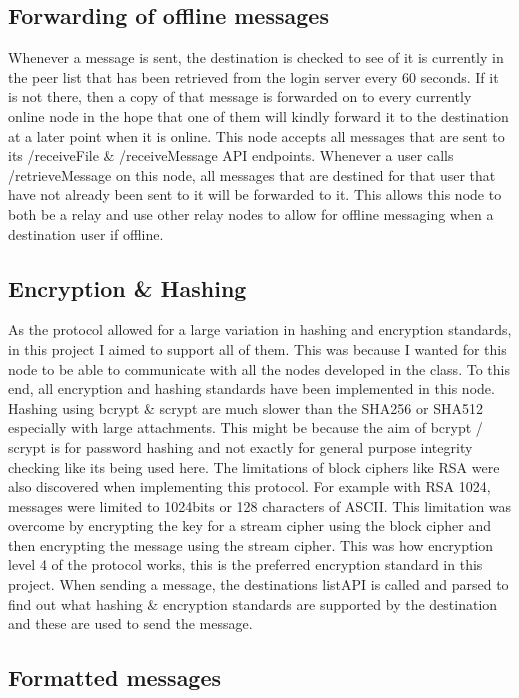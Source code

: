 \documentclass[a4paper,10pt,twoside]{article}
\begin{document}
\subsection{Forwarding of offline messages}

Whenever a message is sent, the destination is checked to see of it is currently in the peer list that has been retrieved from the login server every 60 seconds. If it is not there, then a copy of that message is forwarded on to every currently online node in the hope that one of them will kindly forward it to the destination at a later point when it is online. This node accepts all messages that are sent to its /receiveFile \& /receiveMessage API endpoints. Whenever a user calls /retrieveMessage on this node, all messages that are destined for that user that have not already been sent to it will be forwarded to it. This allows this node to both be a relay and use other relay nodes to allow for offline messaging when a destination user if offline.

\subsection{Encryption \& Hashing}

As the protocol allowed for a large variation in hashing and encryption standards, in this project I aimed to support all of them. This was because I wanted for this node to be able to communicate with all the nodes developed in the class. To this end, all encryption and hashing standards have been implemented in this node. Hashing using bcrypt \& scrypt are much slower than the SHA256 or SHA512 especially with large attachments. This might be because the aim of bcrypt / scrypt is for password hashing and not exactly for general purpose integrity checking like its being used here. The limitations of block ciphers like RSA were also discovered when implementing this protocol. For example with RSA 1024, messages were limited to 1024bits or 128 characters of ASCII. This limitation was overcome by encrypting the key for a stream cipher using the block cipher and then encrypting the message using the stream cipher. This was how encryption level 4 of the protocol works, this is the preferred encryption standard in this project. When sending a message, the destinations listAPI is called and parsed to find out what hashing \& encryption standards are supported by the destination and these are used to send the message.

\subsection{Formatted messages}
\end{document}
